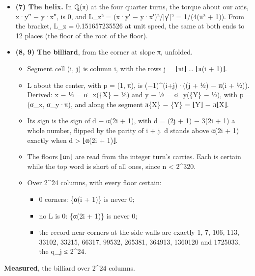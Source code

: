 \begin{itemize}
\item \textbf{(7) The helix.} In ℚ(π) at the four quarter turns, the torque about our axis, x·y″ − y·x″, is 0, and L\_\allowbreak{}z² = (x·y′ − y·x′)²/|γ′|² = 1/(4(π² + 1)). From the bracket, L\_\allowbreak{}z = 0.151657235526 at unit speed, the same at both ends to 12 places (the floor of the root of the floor).
\item \textbf{(8, 9) The billiard}, from the corner at slope π, unfolded.

\begin{itemize}
\item Segment cell (i, j) is column i, with the rows j = ⌊πi⌋ … ⌊π(i + 1)⌋.
\item L about the center, with p = (1, π), is (−1)\textasciicircum{}(i+j)·((j + ½) − π(i + ½)). Derived: x − ½ = σ\_\allowbreak{}x(\{X\} − ½) and y − ½ = σ\_\allowbreak{}y(\{Y\} − ½), with p = (σ\_\allowbreak{}x, σ\_\allowbreak{}y·π), and along the segment π\{X\} − \{Y\} = ⌊Y⌋ − π⌊X⌋.
\item Its sign is the sign of d − α(2i + 1), with d = (2j + 1) − 3(2i + 1) a whole number, flipped by the parity of i + j. d stands above α(2i + 1) exactly when d > ⌊α(2i + 1)⌋.
\item The floors ⌊αn⌋ are read from the integer turn's carries. Each is certain while the top word is short of all ones, since n < 2\textasciicircum{}320.
\item Over 2\textasciicircum{}24 columns, with every floor certain:

\begin{itemize}
\item 0 corners: \{α(i + 1)\} is never 0;
\item no L is 0: \{α(2i + 1)\} is never 0;
\item the record near-corners at the side walls are exactly 1, 7, 106, 113, 33102, 33215, 66317, 99532, 265381, 364913, 1360120 and 1725033, the q\_\allowbreak{}j ≤ 2\textasciicircum{}24.
\end{itemize}
\end{itemize}
\end{itemize}

\textbf{Measured}, the billiard over 2\textasciicircum{}24 columns.

